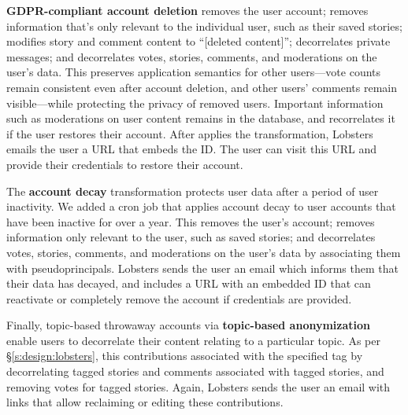 %
\textbf{GDPR-compliant account deletion}
\one{} removes the user account;
\two{} removes information that's only relevant to the individual user, such as
their saved stories;
\three{} modifies story and comment content to ``[deleted content]'';
\four{} decorrelates private messages; and
\five{} decorrelates votes, stories, comments, and moderations on the user's
data. %
%
%
This preserves application semantics for other users---\eg vote counts remain
consistent even after account deletion, and other users' comments
remain visible---while protecting the privacy of removed users.
%
Important information such as moderations on user content remains in the
database, and \sys recorrelates it if the user restores their account.
%
After \sys applies the \xxing transformation, Lobsters emails the user a URL
that embeds the \xx ID.
%
The user can visit this URL and provide their credentials to restore their account.
%
%

The \textbf{account decay} transformation protects
user data after a period of user inactivity.
%
We added a cron job that applies account decay to
user accounts that have been inactive for over a year.
%
This
\one{} removes the user's account;
\two{} removes information only relevant to the user, such as saved stories;
\three{} and decorrelates votes, stories, comments, and moderations on the
user's data by associating them with pseudoprincipals.
%
%
%
%
Lobsters sends the user an email which informs them that their data has
decayed, and includes a URL with an embedded \xx ID that can reactivate or
completely remove the account if credentials are provided.
%

Finally, topic-based throwaway accounts via \textbf{topic-based
anonymization}
enable users to decorrelate their content relating to a particular topic.
%
As per \S\ref{s:design:lobsters}, this \xxs contributions associated with the
specified tag by \one{} decorrelating tagged stories and comments associated with
tagged stories, and \two{} removing votes for tagged stories.
%
Again, Lobsters sends the user an email with links that allow reclaiming or
editing these contributions.
%

